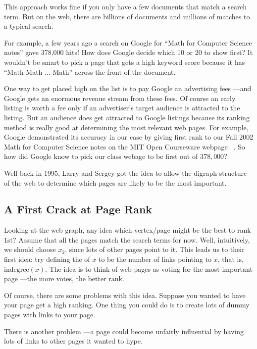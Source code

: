 This approach works fine if you only have a few documents that match a
search term.  But on the web, there are billions of documents and millions
of matches to a typical search.

For example, a few years ago a search on Google for ``Math for
Computer Science notes'' gave 378,000 hits!  How does Google decide
which 10 or 20 to show first?  It wouldn't be smart to pick a page
that gets a high keyword score because it has ``Math Math $\dots$
Math'' across the front of the document.

One way to get placed high on the list is to pay Google an advertising
fees ---and Google gets an enormous revenue stream from these fees.
Of course an early listing is worth a fee only if an advertiser's
target audience is attracted to the listing.  But an audience does get
attracted to Google listings because its ranking method is really good
at determining the most relevant web pages.  For example, Google
demonstrated its accuracy in our case by giving first rank to our Fall
2002 Math for Computer Science notes on the MIT Open Courseware
webpage \smiley\ .  So how did Google know to pick our class webage to
be first out of $378,000$?

Well back in 1995, Larry and Sergey got the idea to allow the digraph
structure of the web to determine which pages are likely to be the most
important.

\subsection{A First Crack at Page Rank}

Looking at the web graph, any idea which vertex/page might be the best to
rank $1$st?  Assume that all the pages match the search terms for now.
Well, intuitively, we should choose $x_2$, since lots of other pages point
to it.  This leads us to their first idea: try defining the  of $x$ to be the number of links pointing to $x$, that is,
$\text{indegree}(x)$.  The idea is to think of web pages as voting for the
most important page ---the more votes, the better rank.

Of course, there are some problems with this idea.  Suppose you wanted
to have your page get a high ranking.  One thing you could do is to
create lots of dummy pages with links to your page.


There is another problem ---a page could become unfairly influential by
having lots of links to other pages it wanted to hype.


